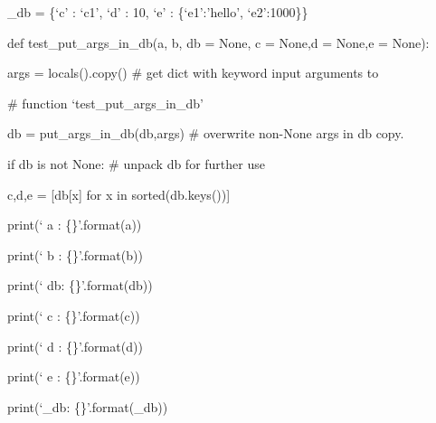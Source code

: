 \documentclass[letterpaper,10pt,english]{sphinxmanual}
\begin{document}
\begin{fulllineitems}
\begin{description}
\item[{Example usage:}] \leavevmode
\begin{DUlineblock}{0em}
\item[] \_db = \{‘c’ : ‘c1’, ‘d’ : 10, ‘e’ : \{‘e1’:’hello’, ‘e2’:1000\}\}
\item[] 
\item[] def test\_put\_args\_in\_db(a, b, db = None, c = None,d = None,e = None):
\item[] 
\item[]
\begin{DUlineblock}{\DUlineblockindent}
\item[] args = locals().copy()  \# get dict with keyword input arguments to 
\item[]
\begin{DUlineblock}{\DUlineblockindent}
\item[]
\begin{DUlineblock}{\DUlineblockindent}
\item[] \# function ‘test\_put\_args\_in\_db’
\item[] 
\end{DUlineblock}
\item[] db = put\_args\_in\_db(db,args) \# overwrite non-None args in db copy.
\item[] 
\end{DUlineblock}
\item[] if db is not None: \# unpack db for further use
\item[]
\begin{DUlineblock}{\DUlineblockindent}
\item[]
\begin{DUlineblock}{\DUlineblockindent}
\item[] c,d,e = {[}db{[}x{]} for x in sorted(db.keys()){]}
\item[] 
\end{DUlineblock}
\item[] print(‘ a : \{\}’.format(a))
\item[] print(‘ b : \{\}’.format(b))
\item[] print(‘ db: \{\}’.format(db))
\item[] print(‘ c : \{\}’.format(c))
\item[] print(‘ d : \{\}’.format(d))
\item[] print(‘ e : \{\}’.format(e))
\item[] print(‘\_db: \{\}’.format(\_db))
\end{DUlineblock}
\end{DUlineblock}
\end{DUlineblock}

\end{description}

\end{fulllineitems}
\end{document}

